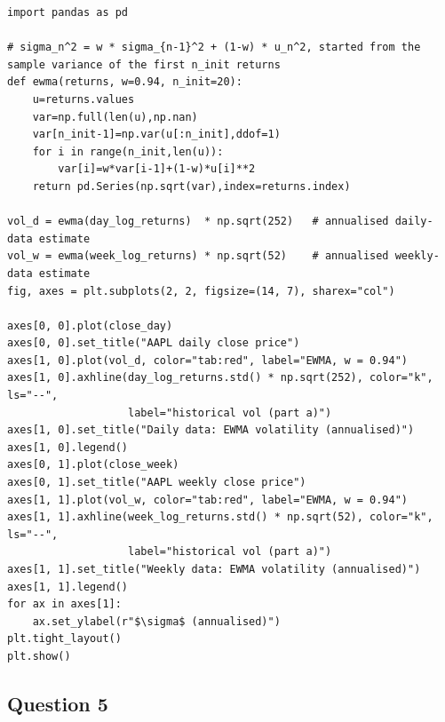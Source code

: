 \documentclass[11pt,a4paper]{article}
\begin{document}
\begin{lstlisting}[caption={Q4b: EWMA volatility estimates ($w=0.94$, first 20 observations for $\sigma^*$).}, label={lst:q4b}]
import pandas as pd

# sigma_n^2 = w * sigma_{n-1}^2 + (1-w) * u_n^2, started from the sample variance of the first n_init returns
def ewma(returns, w=0.94, n_init=20):
    u=returns.values
    var=np.full(len(u),np.nan)
    var[n_init-1]=np.var(u[:n_init],ddof=1)
    for i in range(n_init,len(u)):
        var[i]=w*var[i-1]+(1-w)*u[i]**2
    return pd.Series(np.sqrt(var),index=returns.index)

vol_d = ewma(day_log_returns)  * np.sqrt(252)   # annualised daily-data estimate
vol_w = ewma(week_log_returns) * np.sqrt(52)    # annualised weekly-data estimate
fig, axes = plt.subplots(2, 2, figsize=(14, 7), sharex="col")

axes[0, 0].plot(close_day)
axes[0, 0].set_title("AAPL daily close price")
axes[1, 0].plot(vol_d, color="tab:red", label="EWMA, w = 0.94")
axes[1, 0].axhline(day_log_returns.std() * np.sqrt(252), color="k", ls="--",
                   label="historical vol (part a)")
axes[1, 0].set_title("Daily data: EWMA volatility (annualised)")
axes[1, 0].legend()
axes[0, 1].plot(close_week)
axes[0, 1].set_title("AAPL weekly close price")
axes[1, 1].plot(vol_w, color="tab:red", label="EWMA, w = 0.94")
axes[1, 1].axhline(week_log_returns.std() * np.sqrt(52), color="k", ls="--",
                   label="historical vol (part a)")
axes[1, 1].set_title("Weekly data: EWMA volatility (annualised)")
axes[1, 1].legend()
for ax in axes[1]:
    ax.set_ylabel(r"$\sigma$ (annualised)")
plt.tight_layout()
plt.show()
\end{lstlisting}

\subsection{Question 5}
\end{document}
